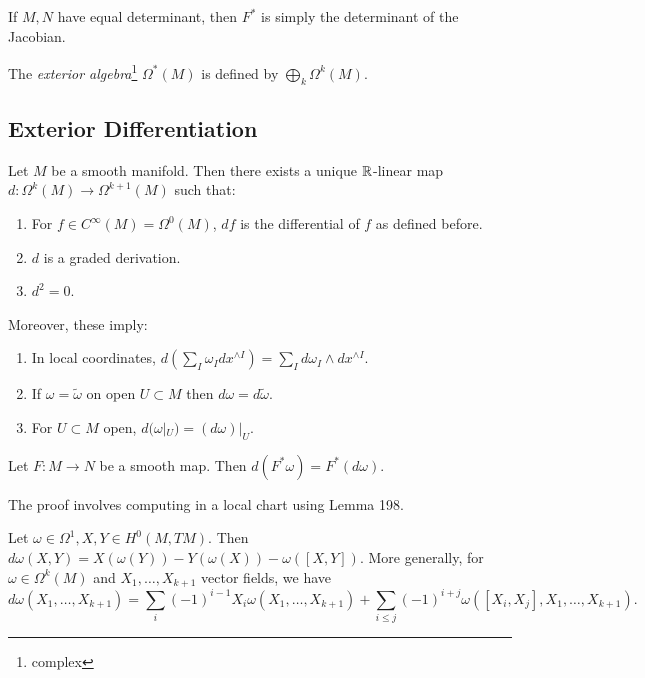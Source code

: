 \documentclass[twoside, 10pt]{article}
\begin{document}
    \begin{prop} If $M,N$ have equal determinant, then $F^*$ is simply the
    determinant of the Jacobian.  \end{prop}

    \begin{defn} The \textit{exterior algebra}\footnote{complex} $\Omega^*(M)$
    is defined by $\bigoplus_k \Omega^k(M)$.  \end{defn}

    \subsection{Exterior Differentiation}%
    
    \begin{thm} Let $M$ be a smooth manifold. Then there exists a unique
        $\mathbb{R}$-linear map $d: \Omega^k(M) \to \Omega^{k+1}(M)$ such that:
        \begin{enumerate} \item For $f \in C^{\infty}(M) = \Omega^0(M)$, $df$
            is the differential of $f$ as defined before.  \item $d$ is a
        graded derivation.  \item $d^2 = 0$.  \end{enumerate} Moreover, these
        imply: \begin{enumerate}[label=(\alph*)] \item In local coordinates, $d
            \left( \sum_I \omega_I dx^{\wedge I} \right) = \sum_I d\omega_I
            \wedge dx^{\wedge I}$.  \item If $\omega = \widetilde{\omega}$ on
    open $U \subset M$ then $d\omega = d\widetilde{\omega}$.  \item For $U
    \subset M$ open, $d(\omega |_U) = (d\omega)|_U$.  \end{enumerate} \end{thm}
    
    \begin{lem} Let $F:M \to N$ be a smooth map. Then $d(F^*\omega) =
    F^*(d\omega)$.  \end{lem}

    The proof involves computing in a local chart using Lemma 198.

    \begin{prop} Let $\omega \in \Omega^1, X,Y \in H^0(M,TM)$. Then $d
        \omega(X,Y) = X(\omega(Y)) - Y(\omega(X)) - \omega([X,Y])$. More
        generally, for $\omega \in \Omega^k(M)$ and $X_1, \ldots, X_{k+1}$
        vector fields, we have \[ d\omega(X_1, \ldots, X_{k+1}) = \sum_i
        (-1)^{i-1} X_i \omega(X_1, \ldots, X_{k+1}) + \sum_{i\leq j} (-1)^{i+j}
    \omega([X_i,X_j], X_1, \ldots, X_{k+1}). \] \end{prop}
\end{document}
